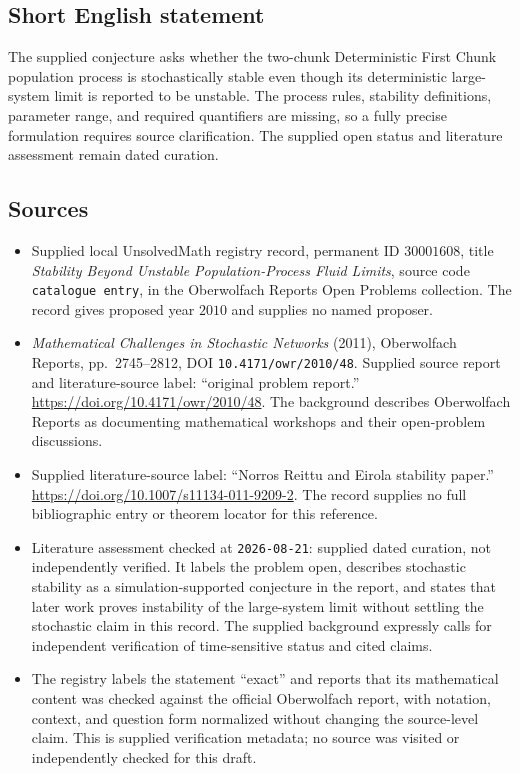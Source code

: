 \documentclass[11pt]{article}
\begin{document}
\subsection{Short English statement}
The supplied conjecture asks whether the two-chunk Deterministic First Chunk population process is stochastically stable even though its deterministic large-system limit is reported to be unstable. The process rules, stability definitions, parameter range, and required quantifiers are missing, so a fully precise formulation requires source clarification. The supplied open status and literature assessment remain dated curation.
\subsection{Sources}
\begin{itemize}
\item Supplied local UnsolvedMath registry record, permanent ID \(30001608\), title \emph{Stability Beyond Unstable Population-Process Fluid Limits}, source code \texttt{catalogue entry}, in the Oberwolfach Reports Open Problems collection. The record gives proposed year \(2010\) and supplies no named proposer.
\item \emph{Mathematical Challenges in Stochastic Networks} (2011), Oberwolfach Reports, pp.\ 2745--2812, DOI \texttt{10.4171/owr/2010/48}. Supplied source report and literature-source label: ``original problem report.'' \url{https://doi.org/10.4171/owr/2010/48}. The background describes Oberwolfach Reports as documenting mathematical workshops and their open-problem discussions.
\item Supplied literature-source label: ``Norros Reittu and Eirola stability paper.'' \url{https://doi.org/10.1007/s11134-011-9209-2}. The record supplies no full bibliographic entry or theorem locator for this reference.
\item Literature assessment checked at \texttt{2026-08-21}: supplied dated curation, not independently verified. It labels the problem open, describes stochastic stability as a simulation-supported conjecture in the report, and states that later work proves instability of the large-system limit without settling the stochastic claim in this record. The supplied background expressly calls for independent verification of time-sensitive status and cited claims.
\item The registry labels the statement ``exact'' and reports that its mathematical content was checked against the official Oberwolfach report, with notation, context, and question form normalized without changing the source-level claim. This is supplied verification metadata; no source was visited or independently checked for this draft.
\end{itemize}
\end{document}
